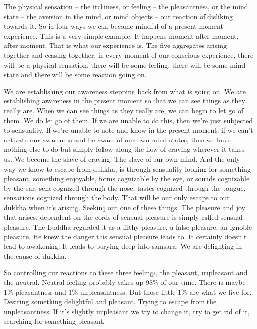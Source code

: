 \documentclass[letterpaper,10pt,english]{sphinxmanual}
\begin{document}
\sphinxAtStartPar
The physical sensation – the itchiness, or feeling – the pleasantness,
or the mind state – the aversion in the mind, or mind objects – our reaction
of disliking towards it. So in four ways we can become mindful of a present
moment experience. This is a very simple example. It happens moment after
moment, after moment. That is what our experience is. The five aggregates
arising  together  and  ceasing  together,  in  every  moment  of  our  conscious
experience,  there  will  be  a  physical  sensation,  there  will  be  some  feeling,
  there will be some mind state and there will be some reaction going on.

\sphinxAtStartPar
We are establishing our awareness stepping back from what is going
on. We are establishing awareness in the present moment so that we can see
things as they really are. When we can see things as they really are, we can
begin to let go of them. We do let go of them. If we are unable to do this,
then we’re just subjected to sensuality. If we’re unable to note and know in
the present moment, if we can’t activate our awareness and be aware of our
own mind states, then we have nothing else to do but simply follow along the
flow of craving wherever it takes us. We become the slave of craving. The
slave of our own mind. And the only way we know to escape from dukkha,
is through sensuality looking for something pleasant, something enjoyable,
forms cognizable by the eye, or sounds cognizable by the ear, sent cognized
through the nose, tastes cognized through the tongue, sensations cognized
through the body. That will be our only escape to our dukkha when it’s arising. Seeking out one of these things. The pleasure and joy that arises, dependent on the cords of sensual pleasure is simply called sensual pleasure. The
Buddha regarded it as a filthy pleasure, a false pleasure, an ignoble pleasure.
He
knew the danger this sensual pleasure leads to. It certainly doesn’t lead to
awakening. It leads to burying deep into samsara. We are delighting in the
cause of dukkha.

\sphinxAtStartPar
So  controlling  our  reactions  to  these  three  feelings,  the  pleasant,
unpleasant  and  the  neutral.  Neutral  feeling  probably  takes  up  98\%  of  our
time.  There  is  maybe  1\%  pleasantness  and  1\%  unpleasantness.  But  those
little 1\% are what we live for. Desiring something delightful and pleasant.
Trying to escape from the unpleasantness. If it’s slightly unpleasant we try to
change it, try to get rid of it, searching for something pleasant.
\end{document}
